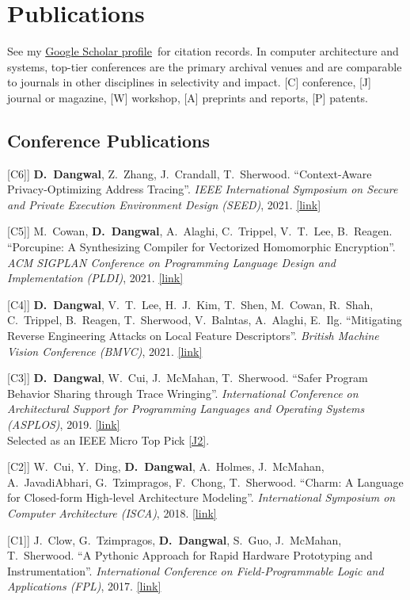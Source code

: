 \documentclass[11pt,letterpaper]{article}
\newcommand{\me}{\textbf{D.~Dangwal}}
\newcommand{\note}[1]{\\ \textcolor{noteRed}{#1}}
\newcommand{\pubtarget}[1]{\raisebox{\baselineskip}[0pt][0pt]{\hypertarget{pub:#1}{}}[#1]}
\newcommand{\pref}[1]{\hyperlink{pub:#1}{[#1]}}
\newcommand{\paperlink}[1]{\href{#1}{[link]}}
\newcommand{\scholar}{\href{https://scholar.google.com/citations?user=11KckrAAAAAJ}{Google Scholar profile}}
\begin{document}
\section{Publications}

See my \scholar\ for citation records. In computer architecture and systems, top-tier conferences are the primary archival venues and are comparable to journals in other disciplines in selectivity and impact. [C] conference, [J] journal or magazine, [W] workshop, [A] preprints and reports, [P] patents.

\subsection{Conference Publications}

\begin{publist}
\item[\pubtarget{C6}] \me, Z.~Zhang, J.~Crandall, T.~Sherwood. ``Context-Aware Privacy-Optimizing Address Tracing''. \emph{IEEE International Symposium on Secure and Private Execution Environment Design (SEED)}, 2021. \paperlink{https://ieeexplore.ieee.org/document/9604789}
\item[\pubtarget{C5}] M.~Cowan, \me, A.~Alaghi, C.~Trippel, V.~T.~Lee, B.~Reagen. ``Porcupine: A Synthesizing Compiler for Vectorized Homomorphic Encryption''. \emph{ACM SIGPLAN Conference on Programming Language Design and Implementation (PLDI)}, 2021. \paperlink{https://dl.acm.org/doi/10.1145/3453483.3454050}
\item[\pubtarget{C4}] \me, V.~T.~Lee, H.~J.~Kim, T.~Shen, M.~Cowan, R.~Shah, C.~Trippel, B.~Reagen, T.~Sherwood, V.~Balntas, A.~Alaghi, E.~Ilg. ``Mitigating Reverse Engineering Attacks on Local Feature Descriptors''. \emph{British Machine Vision Conference (BMVC)}, 2021. \paperlink{https://bmva-archive.org.uk/bmvc/2021/assets/papers/1603.pdf}
\item[\pubtarget{C3}] \me, W.~Cui, J.~McMahan, T.~Sherwood. ``Safer Program Behavior Sharing through Trace Wringing''. \emph{International Conference on Architectural Support for Programming Languages and Operating Systems (ASPLOS)}, 2019. \paperlink{https://dl.acm.org/doi/10.1145/3297858.3304074}
  \note{Selected as an IEEE Micro Top Pick \pref{J2}.}
\item[\pubtarget{C2}] W.~Cui, Y.~Ding, \me, A.~Holmes, J.~McMahan, A.~JavadiAbhari, G.~Tzimpragos, F.~Chong, T.~Sherwood. ``Charm: A Language for Closed-form High-level Architecture Modeling''. \emph{International Symposium on Computer Architecture (ISCA)}, 2018. \paperlink{https://ieeexplore.ieee.org/document/8416825}
\item[\pubtarget{C1}] J.~Clow, G.~Tzimpragos, \me, S.~Guo, J.~McMahan, T.~Sherwood. ``A Pythonic Approach for Rapid Hardware Prototyping and Instrumentation''. \emph{International Conference on Field-Programmable Logic and Applications (FPL)}, 2017. \paperlink{https://ieeexplore.ieee.org/document/8056860}
\end{publist}
\end{document}
